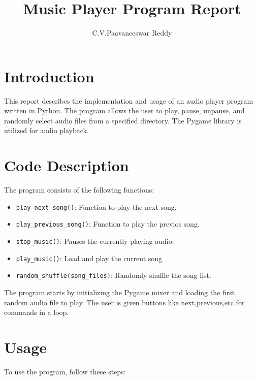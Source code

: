 \documentclass{article}
\begin{document}
\title{Music Player Program Report}
\author{C.V.Paavaneeswar Reddy}

\maketitle

\section{Introduction}
This report describes the implementation and usage of an audio player program written in Python. The program allows the user to play, pause, unpause, and randomly select audio files from a specified directory. The Pygame library is utilized for audio playback.

\section{Code Description}
The program consists of the following functions:

\begin{itemize}
  \item \texttt{play\_next\_song()}: Function to play the next song.

  \item \texttt{play\_previous\_song()}: Function to play the previos song.

  \item \texttt{stop\_music()}: Pauses the currently playing audio.
  \item \texttt{play\_music()}: Load and play the current song

  \item \texttt{random\_shuffle(song\_files)}: Randomly shuffle the song list.
\end{itemize}

The program starts by initializing the Pygame mixer and loading the first random audio file to play. The user is given buttons like next,previous,etc for commands in a loop.

\section{Usage}
To use the program, follow these steps:
\end{document}
